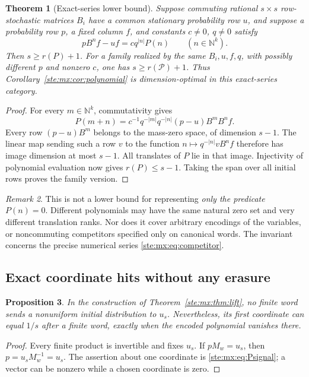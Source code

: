 \documentclass[11pt,letterpaper]{article}
\newtheorem{theorem}{Theorem}[section]
\newtheorem{proposition}[theorem]{Proposition}
\theoremstyle{definition}
\theoremstyle{remark}
\newtheorem{remark}[theorem]{Remark}
\newcommand{\N}{\mathbb N}
\begin{document}
\begin{theorem}[Exact-series lower bound]\label{ste:mx:thm:optimal}
Suppose commuting rational $s\times s$ row-stochastic matrices $B_i$ have a common
stationary probability row $u$, and suppose a probability row $p$, a fixed
column $f$, and constants $c\ne0$, $q\ne0$ satisfy
\begin{equation}\label{ste:mx:eq:competitor}
 pB^nf-uf=cq^{|n|}P(n)\qquad(n\in\N^k).
\end{equation}
Then $s\geq r(P)+1$. For a family realized by the same $B_i,u,f,q$, with
possibly different $p$ and nonzero $c$, one has $s\geq r(\mathcal P)+1$.
Thus Corollary~\ref{ste:mx:cor:polynomial} is dimension-optimal in this exact-series
category.
\end{theorem}
\begin{proof}
For every $m\in\N^k$, commutativity gives
\[
 P(m+n)=c^{-1}q^{-|m|}q^{-|n|}(p-u)B^mB^nf.
\]
Every row $(p-u)B^m$ belongs to the mass-zero space, of dimension $s-1$.
The linear map sending such a row $v$ to the function
$n\mapsto q^{-|n|}vB^nf$ therefore has image dimension at most $s-1$.
All translates of $P$ lie in that image. Injectivity of polynomial evaluation
now gives $r(P)\leq s-1$. Taking the span over all initial rows proves the
family version.
\end{proof}

\begin{remark}
This is not a lower bound for representing \emph{only the predicate}
$P(n)=0$. Different polynomials may have the same natural zero set and very
different translation ranks. Nor does it cover arbitrary encodings of the
variables, or noncommuting competitors specified only on canonical words.
The invariant concerns the precise numerical series \eqref{ste:mx:eq:competitor}.
\end{remark}

\subsection{Exact coordinate hits without any erasure}

\begin{proposition}\label{ste:mx:prop:noerasure}
In the construction of Theorem~\ref{ste:mx:thm:lift}, no finite word sends a
nonuniform initial distribution to $u_s$. Nevertheless, its first coordinate
can equal $1/s$ after a finite word, exactly when the encoded polynomial
vanishes there.
\end{proposition}
\begin{proof}
Every finite product is invertible and fixes $u_s$. If $pM_w=u_s$, then
$p=u_sM_w^{-1}=u_s$. The assertion about one coordinate is
\eqref{ste:mx:eq:Psignal}; a vector can be nonzero while a chosen coordinate is zero.
\end{proof}
\end{document}

